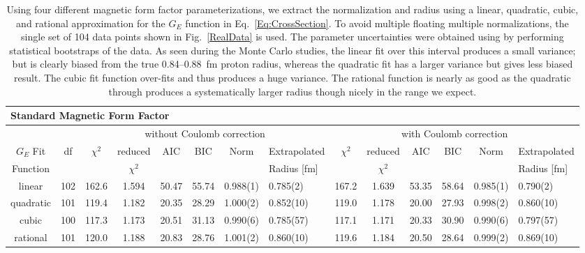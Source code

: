 \documentclass[10pt,superscriptaddress,aps,prc,twocolumn]{revtex4-1}
\begin{document}
\begin{table}
\caption{Using four different magnetic form factor parameterizations, we extract the normalization
and radius using a linear, quadratic, cubic, and rational approximation for the $G_E$ function in 
Eq.~\ref{Eq:CrossSection}.
To avoid multiple floating multiple normalizations, the single set of 104 data points 
shown in Fig.~\ref{RealData} is used.
The parameter uncertainties were obtained using by performing statistical bootstraps of the data.
As seen during the Monte Carlo studies, the linear fit over this interval produces a small variance; 
but is clearly biased from the true 0.84--0.88~fm proton radius, whereas the quadratic fit has a 
larger variance but gives less biased result.   
The cubic fit function over-fits and thus produces a huge variance.   
The rational function is nearly as good as the quadratic through
produces a systematically larger radius though nicely in the range we expect.}
\begin{tabular}{cc|cccccl|cccccl}                                                  \hline \hline
\multicolumn{14}{l}{Standard Magnetic Form Factor}                                 \\ \hline
          &     & \multicolumn{6}{c}{without Coulomb correction}                 & \multicolumn{6}{|c}{with Coulomb correction} \\
$G_E$ Fit & df  & $\chi^2$ & reduced   & AIC    & BIC    & Norm      & Extrapolated & $\chi^2$ & reduced   & AIC    & BIC    & Norm      & Extrapolated      \\  
Function  &     &          & $\chi^2$  &        &        &           & Radius [fm]      &          & $\chi^2$  &        &        &           & Radius [fm]        \\ \hline
linear    & 102 & 162.6    & 1.594     & 50.47  & 55.74  & 0.988(1)  & 0.785(2)  & 167.2    & 1.639     & 53.35  & 58.64  & 0.985(1)  & 0.790(2)    \\
quadratic & 101 & 119.4    & 1.182     & 20.35  & 28.29  & 1.000(2)  & 0.852(10) & 119.0    & 1.178     & 20.00  & 27.93  & 0.998(2)  & 0.860(10)   \\
cubic     & 100 & 117.3    & 1.173     & 20.51  & 31.13  & 0.990(6)  & 0.785(57) & 117.1    & 1.171     & 20.33  & 30.90  & 0.990(6)  & 0.797(57)   \\    
rational  & 101 & 120.0    & 1.188     & 20.83  & 28.76  & 1.001(2)  & 0.860(10) & 119.6    & 1.184     & 20.50  & 28.64  & 0.999(2)  & 0.869(10)   \\ \hline \hline

\end{tabular}
\end{table}
\end{document}
